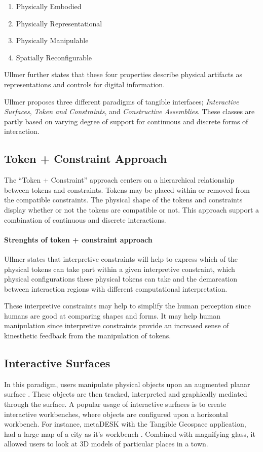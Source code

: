 \begin{enumerate}
	\item{Physically Embodied}
	\item{Physically Representational}
	\item{Physically Manipulable}
	\item{Spatially Reconfigurable}
\end{enumerate}

Ullmer further states that these four properties describe physical artifacts as representations and controls for digital information. 

Ullmer proposes three different paradigms of tangible interfaces; \emph{Interactive Surfaces}, \emph{Token and Constraints}, and \emph{Constructive Assemblies}. These classes are partly based on varying degree of support for continuous and discrete forms of interaction\cite{ullmer2002tangible}.

\subsection{Token + Constraint Approach}
The ``Token + Constraint'' approach centers on a hierarchical relationship between tokens and constraints. Tokens may be placed within or removed from the compatible constraints. The physical shape of the tokens and constraints display whether or not the tokens are compatible or not. This approach support a combination of continuous and discrete interactions. 

\paragraph{Strenghts of token + constraint approach}
Ullmer states that interpretive constraints will help to express which of the physical tokens can take part within a given interpretive constraint, which physical configurations these physical tokens can take and the demarcation between interaction regions with different computational interpretation.

These interpretive constraints may help to simplify the human perception since humans are good at comparing shapes and forms. 
It may help human manipulation since interpretive constraints provide an increased sense of kinesthetic feedback from the manipulation of tokens. 

\subsection{Interactive Surfaces}
In this paradigm, users manipulate physical objects upon an augmented planar surface \cite{ullmer2002tangible}. These objects are then tracked, interpreted and graphically mediated through the surface. A popular usage of interactive surfaces is to create interactive workbenches, where objects are configured upon a horizontal workbench. For instance, metaDESK with the Tangible Geospace application, had a large map of a city as it's workbench \cite{ullmer1997metadesk}. Combined with magnifying glass, it allowed users to look at 3D models of particular places in a town. 


